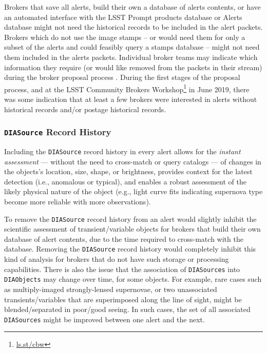\documentclass[DM,lsstdraft,authoryear,toc]{lsstdoc}
\begin{document}
Brokers that save all alerts, build their own a database of alerts contents, or have an automated interface with the LSST Prompt products database or Alerts database might not need the historical records to be included in the alert packets. Brokers which do not use the image stamps -- or would need them for only a subset of the alerts and could feasibly query a stamps database -- might not need them included in the alerts packets. Individual broker teams may indicate which information they require (or would like removed from the packets in their stream) during the broker proposal process . During the first stages of the proposal process, and at the LSST Community Brokers Workshop\footnote{\url{ls.st/cbw}} in June 2019, there was some indication that at least a few brokers were interested in alerts without historical records and/or postage historical records.

\subsubsection{{\tt DIASource} Record History}\label{sssec:packets_remove_hist}

Including the {\tt DIASource} record history in every alert allows for the \emph{instant assessment} --- without the need to cross-match or query catalogs --- of changes in the objects's location, size, shape, or brightness, provides context for the latest detection (i.e., anomalous or typical), and enables a robust assessment of the likely physical nature of the object (e.g., light curve fits indicating supernova type become more reliable with more observations). 

To remove the {\tt DIASource} record history from an alert would slightly inhibit the scientific assessment of transient/variable objects for brokers that build their own database of alert contents, due to the time required to cross-match with the database. Removing the {\tt DIASource} record history would completely inhibit this kind of analysis for brokers that do not have such storage or processing capabilities. There is also the issue that the association of {\tt DIASources} into {\tt DIAObjects} may change over time, for some objects. For example, rare cases such as multiply-imaged strongly-lensed supernovae, or two unassociated transients/variables that are superimposed along the line of sight, might be blended/separated in poor/good seeing. In such cases, the set of all associated {\tt DIASources} might be improved between one alert and the next. 
\end{document}
